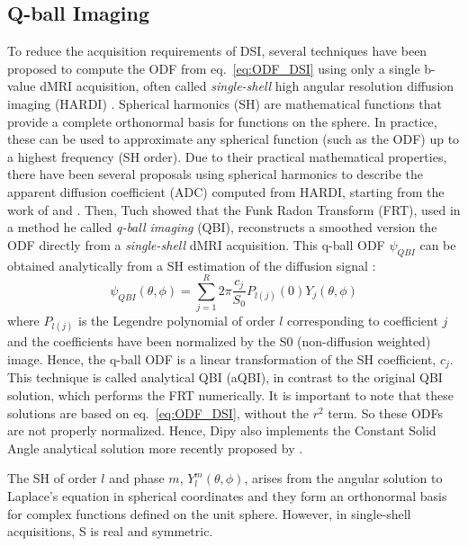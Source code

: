 \documentclass{bioinfo}
\begin{document}
\subsection{Q-ball Imaging}
To reduce the acquisition requirements of DSI, several techniques
have been proposed to compute the ODF from eq.~\ref{eq:ODF_DSI}
using only a single b-value dMRI acquisition, often called
\emph{single-shell} high angular resolution diffusion imaging (HARDI)
\citep{tuch-reese-etal:02,descoteaux-deriche-etal:11}.
Spherical harmonics (SH) are mathematical functions that provide
a complete orthonormal basis for functions on the sphere. In practice, these
can be used to approximate any spherical function (such as the ODF) up to a
highest frequency (SH order). Due to their practical mathematical properties,
there have been several proposals using spherical harmonics to describe
the apparent diffusion coefficient (ADC) computed from HARDI, starting from the
work of \citet{Frank2001, Frank2002, alexander-barker-etal:02} and
\citet{tuch-reese-etal:02}. Then, Tuch showed that the Funk Radon Transform
(FRT), used in a method he called \emph{q-ball imaging} (QBI),
reconstructs a smoothed version the ODF directly from a
\emph{single-shell} dMRI acquisition. This q-ball ODF $\psi_{QBI}$ can
be obtained analytically from a
SH estimation of the diffusion signal \citep{descoteaux-angelino-etal:07,
  hess-mukherjee-etal:06, anderson:05}:
\begin{equation}\label{eq.qball}
\psi_{QBI}(\theta, \phi) = \sum_{j=1}^{R} 2\pi \frac{c_j}{S_0} P_{l(j)} (0) Y_{j} (\theta, \phi)
\end{equation}
where $P_{l(j)}$ is the Legendre polynomial of order $l$ corresponding to
coefficient $j$ and the coefficients have been normalized by the S0
(non-diffusion weighted)
image. Hence, the q-ball ODF is a linear transformation of the SH coefficient,
$c_j$. This technique is called analytical QBI (aQBI), in contrast to the
original QBI solution, which performs the FRT numerically. It is
important to note that these solutions are based on
eq.~\ref{eq:ODF_DSI}, without the $r^2$ term. So these ODFs are
not properly normalized. Hence, Dipy also implements
the Constant Solid Angle analytical solution more recently proposed by
\citep{aganj-lenglet-etal:10,tristan-vega-westin-etal:09}.

The SH of order $l$
and phase $m$, $Y_{l}^{m}(\theta, \phi)$, arises from the angular solution to
Laplace's equation in spherical coordinates and they form an orthonormal basis
for complex functions defined on the unit sphere. However, in single-shell
acquisitions, S is real and symmetric.
\end{document}
